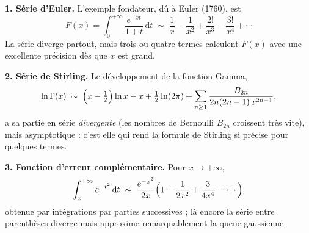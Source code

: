 \decsep{}



\begin{mdframed}[style=exbar]
  \textbf{1. Série d'Euler.}\enspace{}%
  L'exemple fondateur, dû à Euler (1760), est
  \[
    F(x)=\int_{0}^{+\infty}\frac{e^{-xt}}{1+t}\,\mathrm{d}t
    \;\sim\;\frac{1}{x}-\frac{1}{x^{2}}+\frac{2!}{x^{3}}-\frac{3!}{x^{4}}+\cdots
  \]
  La série diverge partout, mais trois ou quatre termes calculent $F(x)$ avec une
  excellente précision dès que $x$ est grand.

  \smallskip\noindent
  \textbf{2. Série de Stirling.}\enspace{}%
  Le développement de la fonction Gamma,
  \[
    \ln\Gamma(x)\;\sim\;\Bigl(x-\tfrac12\Bigr)\ln x-x+\tfrac12\ln(2\pi)
      +\sum_{n\geq 1}\frac{B_{2n}}{2n(2n-1)\,x^{2n-1}},
  \]
  a sa partie en série \emph{divergente} (les nombres de Bernoulli $B_{2n}$
  croissent très vite), mais asymptotique : c'est elle qui rend la formule de
  Stirling si précise pour quelques termes.

  \smallskip\noindent
  \textbf{3. Fonction d'erreur complémentaire.}\enspace%
  Pour $x\to+\infty$,
  \[
    \int_{x}^{+\infty}e^{-t^{2}}\,\mathrm{d}t
    \;\sim\;\frac{e^{-x^{2}}}{2x}\Bigl(1-\frac{1}{2x^{2}}+\frac{3}{4x^{4}}
      -\cdots\Bigr),
  \]
  obtenue par intégrations par parties successives ; là encore la série entre
  parenthèses diverge mais approxime remarquablement la queue gaussienne.
\end{mdframed}

\vspace{6pt}

